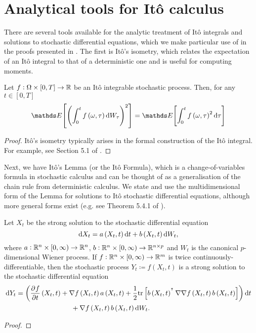 \section{Analytical tools for It\^o calculus}
There are several tools available for the analytic treatment of It\^o integrals and solutions to stochastic differential equations, which we make particular use of in the proofs presented in .
The first is It\^o's isometry, which relates the expectation of an It\^o integral to that of a deterministic one and is useful for computing moments.
\begin{theorem}[It\^o's Isometry]\label{thm:ito_isom}
	Let \(f: \Omega \times [0,T] \to \mathbb{R}\) be an It\^o integrable stochastic process.
	Then, for any \(t \in [0,T]\)
	\[
		\avg{\left(\int_0^t{f\left(\omega, \tau\right)\dif W_\tau}\right)^2} = \avg{\int_0^t{f\left(\omega, \tau\right)^2\dif\tau}}
	\]
\end{theorem}
\begin{proof}
	It\^o's isometry typically arises in the formal construction of the It\^o integral.
	For example, see Section 5.1 of \citet{KallianpurSundar_2014_StochasticAnalysisDiffusion}.
\end{proof}

Next, we have It\^o's Lemma (or the It\^o Formula), which is a change-of-variables formula in stochastic calculus and can be thought of as a generalisation of the chain rule from deterministic calculus.
We state and use the multidimensional form of the Lemma for solutions to It\^o stochastic differential equations, although more general forms exist (e.g. see Theorem 5.4.1 of \citet{KallianpurSundar_2014_StochasticAnalysisDiffusion}).
\begin{theorem}[It\^o's Lemma]\label{thm:ito_lemma}
	Let \(X_t\) be the strong solution to the stochastic differential equation
	\[
		\dif X_t = a\left(X_t, t\right)\dif t + b\left(X_t, t\right)\dif W_t,
	\]
	where \(a: \mathbb{R}^n \times [0,\infty) \to \mathbb{R}^n\), \(b: \mathbb{R}^n \times [0,\infty) \to \mathbb{R}^{n\times p}\) and \(W_t\) is the canonical \(p\)-dimensional Wiener process.
	If \(f: \mathbb{R}^n \times [0, \infty) \to \mathbb{R}^m\) is twice continuously-differentiable, then the stochastic process \(Y_t \coloneqq f\left(X_t, t\right)\) is a strong solution to the stochastic differential equation
	\begin{align*}
		\dif Y_t & = \left(\dpd{f}{t}\left(X_t, t\right) + \nabla f\left(X_t, t\right) a\left(X_t, t\right) + \frac12\mathrm{tr}\left[b\left(X_t, t\right)^{\T} \nabla\nabla f\left(X_t, t\right) b\left(X_t, t\right)\right] \right)\dif t \\
		         & \qquad\qquad\qquad\qquad + \nabla f\left(X_t, t\right)b\left(X_t, t\right) \dif W_t.
	\end{align*}
\end{theorem}
\begin{proof}

\end{proof}

